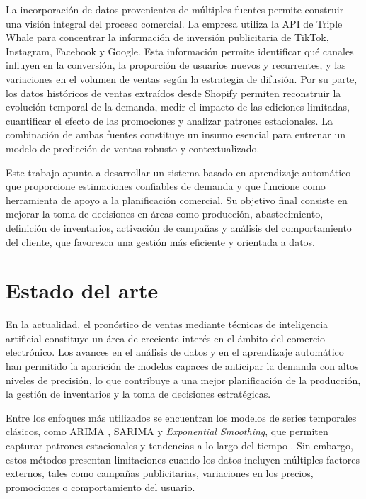 La incorporación de datos provenientes de múltiples fuentes permite construir una visión integral del proceso comercial. 
La empresa utiliza la API de Triple Whale \citep{triplewhale} para concentrar la información de inversión publicitaria de TikTok, Instagram, Facebook y Google.
Esta información permite identificar qué canales influyen en la conversión, la proporción de usuarios nuevos y recurrentes, 
y las variaciones en el volumen de ventas según la estrategia de difusión. 
Por su parte, los datos históricos de ventas extraídos desde Shopify \citep{shopify} permiten reconstruir la evolución temporal de la demanda, medir el impacto de las ediciones limitadas, cuantificar el efecto de las promociones y analizar patrones estacionales. La combinación de ambas fuentes constituye un insumo esencial para entrenar un modelo de predicción de ventas robusto y contextualizado.

Este trabajo apunta a desarrollar un sistema basado en aprendizaje automático que proporcione estimaciones confiables de demanda y que funcione como herramienta de apoyo a la planificación comercial. Su objetivo final consiste en mejorar la toma de decisiones en áreas como producción, abastecimiento, definición de inventarios, activación de campañas y análisis del comportamiento del cliente, que favorezca una gestión más eficiente y orientada a datos.


\section{Estado del arte}

En la actualidad, el pronóstico de ventas mediante técnicas de inteligencia 
artificial constituye un área de creciente interés en el ámbito del comercio electrónico. 
Los avances en el análisis de datos y en el aprendizaje automático han permitido 
la aparición de modelos capaces de anticipar la demanda con altos niveles de 
precisión, lo que contribuye a una mejor planificación de la producción,
 la gestión de inventarios y la toma de decisiones estratégicas.

Entre los enfoques más utilizados se encuentran los modelos de series temporales
 clásicos, como ARIMA \citep{BOOK:4}, SARIMA \citep{boxjenkins1970} y \textit{Exponential Smoothing}, 
 que permiten capturar patrones estacionales y tendencias a lo largo del tiempo
  \citep{BOOK:3}. Sin embargo, estos métodos presentan limitaciones cuando los 
  datos incluyen múltiples factores externos, tales como campañas publicitarias,
   variaciones en los precios, promociones o comportamiento del usuario.

